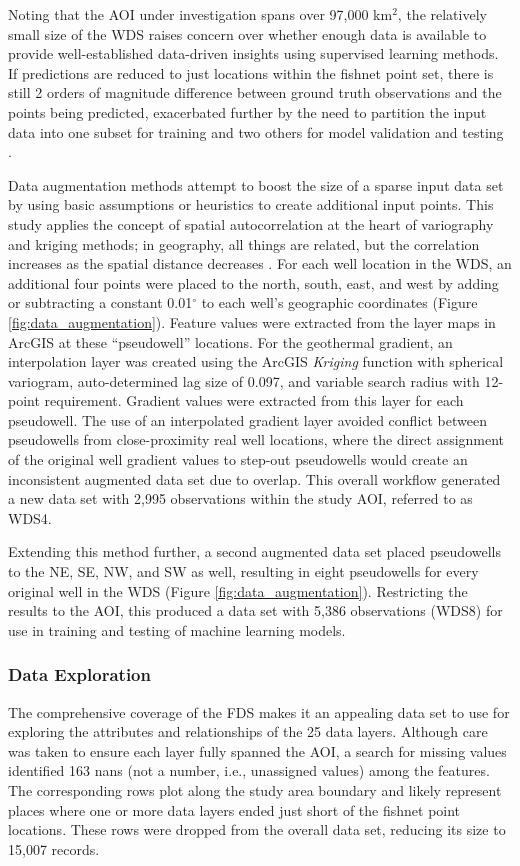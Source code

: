 Noting that the AOI under investigation spans over 97,000 km$^2$, the relatively small size of the WDS raises concern over whether enough data is available to provide well-established data-driven insights using supervised learning methods. If predictions are reduced to just locations within the fishnet point set, there is still 2 orders of magnitude difference between ground truth observations and the points being predicted, exacerbated further by the need to partition the input data into one subset for training and two others for model validation and testing \citep[e.g.,][p.\ 222]{hastie_elements_2009}. 

Data augmentation methods attempt to boost the size of a sparse input data set by using basic assumptions or heuristics to create additional input points. This study applies the concept of spatial autocorrelation at the heart of variography and kriging methods; in geography, all things are related, but the correlation increases as the spatial distance decreases \citep[chap.\ 13]{gimond_intro_2021}. For each well location in the WDS, an additional four points were placed to the north, south, east, and west by adding or subtracting a constant 0.01$^\circ$ to each well’s geographic coordinates (Figure \ref{fig:data_augmentation}). Feature values were extracted from the layer maps in ArcGIS at these “pseudowell” locations. For the geothermal gradient, an interpolation layer was created using the ArcGIS \textit{Kriging} function with spherical variogram, auto-determined lag size of 0.097, and variable search radius with 12-point requirement. Gradient values were extracted from this layer for each pseudowell. The use of an interpolated gradient layer avoided conflict between pseudowells from close-proximity real well locations, where the direct assignment of the original well gradient values to step-out pseudowells would create an inconsistent augmented data set due to overlap. This overall workflow generated a new data set with 2,995 observations within the study AOI, referred to as WDS4. 

Extending this method further, a second augmented data set placed pseudowells to the NE, SE, NW, and SW as well, resulting in eight pseudowells for every original well in the WDS (Figure \ref{fig:data_augmentation}). Restricting the results to the AOI, this produced a data set with 5,386 observations (WDS8) for use in training and testing of machine learning models.

\subsubsection{Data Exploration}
The comprehensive coverage of the FDS makes it an appealing data set to use for exploring the attributes and relationships of the 25 data layers. Although care was taken to ensure each layer fully spanned the AOI, a search for missing values identified 163 \acrshort{nan}s (not a number, i.e., unassigned values) among the features. The corresponding rows plot along the study area boundary and likely represent places where one or more data layers ended just short of the fishnet point locations. These rows were dropped from the overall data set, reducing its size to 15,007 records.

